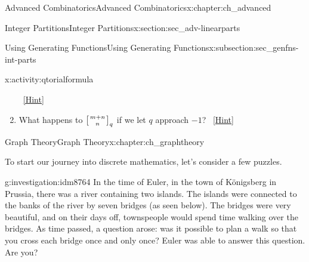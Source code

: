 \documentclass[oneside,10pt,]{book}
\numberwithin{equation}{chapter}
\newcommand{\qchoose}[2]{\left[{#1\atop#2}\right]_q}
\begin{document}
\begin{chapterptx}{Advanced Combinatorics}{}{Advanced Combinatorics}{}{}{x:chapter:ch_advanced}
\begin{sectionptx}{Integer Partitions}{}{Integer Partitions}{}{}{x:section:sec_adv-linearparts}
\begin{subsectionptx}{Using Generating Functions}{}{Using Generating Functions}{}{}{x:subsection:sec_genfns-int-parts}
\begin{activity}{}{x:activity:qtorialformula}
\begin{enumerate}[font=\bfseries,label=(\alph*),ref=\alph*]
\qquad~\hfill{\tiny\hyperlink{g:hint:idm8496-back}{[Hint]}}\item{}What happens to \(\qchoose{m+n}{n}\) if we let \(q\) approach \(-1\)?%
\qquad~\hfill{\tiny\hyperlink{g:hint:idm8525-back}{[Hint]}}\end{enumerate}
\end{activity}
\end{subsectionptx}
\end{sectionptx}
\end{chapterptx}
%
%
\typeout{************************************************}
\typeout{************************************************}
%
\begin{chapterptx}{Graph Theory}{}{Graph Theory}{}{}{x:chapter:ch_graphtheory}
\begin{introduction}{}%
To start our journey into discrete mathematics, let's consider a few puzzles.%
\begin{investigation}{}{g:investigation:idm8764}%
In the time of Euler, in the town of Königsberg in Prussia, there was a river containing two islands. The islands were connected to the banks of the river by seven bridges (as seen below). The bridges were very beautiful, and on their days off, townspeople would spend time walking over the bridges. As time passed, a question arose: was it possible to plan a walk so that you cross each bridge once and only once? Euler was able to answer this question. Are you?%
\begin{sidebyside}{1}{0}{0}{0}%
\begin{sbspanel}{1}%
\end{sbspanel}
\end{sidebyside}
\end{investigation}
\end{introduction}
\end{chapterptx}
\end{document}
